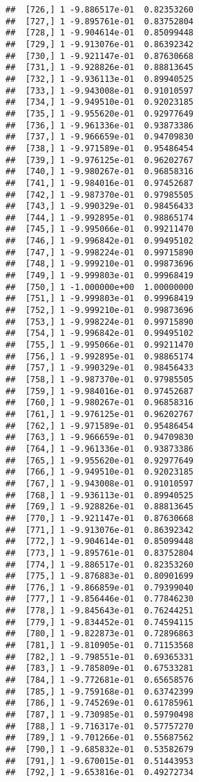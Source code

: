 \documentclass[
  12pt,
]{article}
\begin{document}
\begin{verbatim}
##  [726,] 1 -9.886517e-01  0.82353260
##  [727,] 1 -9.895761e-01  0.83752804
##  [728,] 1 -9.904614e-01  0.85099448
##  [729,] 1 -9.913076e-01  0.86392342
##  [730,] 1 -9.921147e-01  0.87630668
##  [731,] 1 -9.928826e-01  0.88813645
##  [732,] 1 -9.936113e-01  0.89940525
##  [733,] 1 -9.943008e-01  0.91010597
##  [734,] 1 -9.949510e-01  0.92023185
##  [735,] 1 -9.955620e-01  0.92977649
##  [736,] 1 -9.961336e-01  0.93873386
##  [737,] 1 -9.966659e-01  0.94709830
##  [738,] 1 -9.971589e-01  0.95486454
##  [739,] 1 -9.976125e-01  0.96202767
##  [740,] 1 -9.980267e-01  0.96858316
##  [741,] 1 -9.984016e-01  0.97452687
##  [742,] 1 -9.987370e-01  0.97985505
##  [743,] 1 -9.990329e-01  0.98456433
##  [744,] 1 -9.992895e-01  0.98865174
##  [745,] 1 -9.995066e-01  0.99211470
##  [746,] 1 -9.996842e-01  0.99495102
##  [747,] 1 -9.998224e-01  0.99715890
##  [748,] 1 -9.999210e-01  0.99873696
##  [749,] 1 -9.999803e-01  0.99968419
##  [750,] 1 -1.000000e+00  1.00000000
##  [751,] 1 -9.999803e-01  0.99968419
##  [752,] 1 -9.999210e-01  0.99873696
##  [753,] 1 -9.998224e-01  0.99715890
##  [754,] 1 -9.996842e-01  0.99495102
##  [755,] 1 -9.995066e-01  0.99211470
##  [756,] 1 -9.992895e-01  0.98865174
##  [757,] 1 -9.990329e-01  0.98456433
##  [758,] 1 -9.987370e-01  0.97985505
##  [759,] 1 -9.984016e-01  0.97452687
##  [760,] 1 -9.980267e-01  0.96858316
##  [761,] 1 -9.976125e-01  0.96202767
##  [762,] 1 -9.971589e-01  0.95486454
##  [763,] 1 -9.966659e-01  0.94709830
##  [764,] 1 -9.961336e-01  0.93873386
##  [765,] 1 -9.955620e-01  0.92977649
##  [766,] 1 -9.949510e-01  0.92023185
##  [767,] 1 -9.943008e-01  0.91010597
##  [768,] 1 -9.936113e-01  0.89940525
##  [769,] 1 -9.928826e-01  0.88813645
##  [770,] 1 -9.921147e-01  0.87630668
##  [771,] 1 -9.913076e-01  0.86392342
##  [772,] 1 -9.904614e-01  0.85099448
##  [773,] 1 -9.895761e-01  0.83752804
##  [774,] 1 -9.886517e-01  0.82353260
##  [775,] 1 -9.876883e-01  0.80901699
##  [776,] 1 -9.866859e-01  0.79399040
##  [777,] 1 -9.856446e-01  0.77846230
##  [778,] 1 -9.845643e-01  0.76244251
##  [779,] 1 -9.834452e-01  0.74594115
##  [780,] 1 -9.822873e-01  0.72896863
##  [781,] 1 -9.810905e-01  0.71153568
##  [782,] 1 -9.798551e-01  0.69365331
##  [783,] 1 -9.785809e-01  0.67533281
##  [784,] 1 -9.772681e-01  0.65658576
##  [785,] 1 -9.759168e-01  0.63742399
##  [786,] 1 -9.745269e-01  0.61785961
##  [787,] 1 -9.730985e-01  0.59790498
##  [788,] 1 -9.716317e-01  0.57757270
##  [789,] 1 -9.701266e-01  0.55687562
##  [790,] 1 -9.685832e-01  0.53582679
##  [791,] 1 -9.670015e-01  0.51443953
##  [792,] 1 -9.653816e-01  0.49272734

\end{verbatim}
\end{document}
